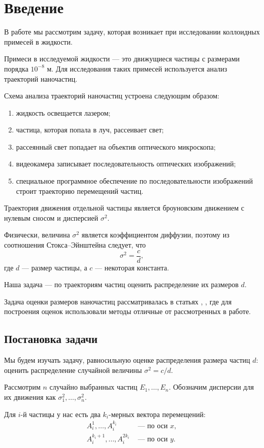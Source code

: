 \documentclass[../paper.tex]{subfiles}
\begin{document}
\section{Введение}
В работе мы рассмотрим задачу, которая возникает при исследовании коллоидных примесей в жидкости.

Примеси в исследуемой жидкости --- это движущиеся частицы с размерами порядка $10^{-8}$ м.
Для исследования таких примесей используется анализ траекторий наночастиц.

Схема анализа траекторий наночастиц устроена следующим образом:
\begin{enumerate}
	\item жидкость освещается лазером;
	\item частица, которая попала в луч, рассеивает свет;
	\item рассеянный свет попадает на объектив оптического микроскопа;
	\item видеокамера записывает последовательность оптических изображений;
	\item специальное программное обеспечение по последовательности изображений строит траекторию перемещений частиц.
\end{enumerate}

Траектория движения отдельной частицы является броуновским движением с нулевым сносом и дисперсией $\sigma^2$.

Физически, величина $\sigma^2$ является коэффициентом диффузии, поэтому из соотношения Стокса--Эйнштейна следует, что
\[
	\sigma^2 = \frac{c}{d}
,\] где $d$ --- размер частицы, а $c$ --- некоторая константа.

Наша задача ---  по траекториям частиц оценить распределение их размеров $d$.

Задача оценки размеров наночастиц рассматривалась 
в статьях \cite{Wagner2014}, \cite{Matsuura2018},
где для построения оценок использовали методы отличные от рассмотренных в работе.
\subsection{Постановка задачи}
Мы будем изучать задачу, равносильную оценке распределения размера частиц $d$: оценить распределение случайной величины $\sigma^2 = c/d$.

Рассмотрим $n$ случайно выбранных частиц $E_1, \dots, E_n$. 
Обозначим дисперсии для их движения как $\sigma_1^2, \dots, \sigma_n^2$. 

Для $i$-й частицы у нас есть два $k_i$-мерных вектора перемещений: 
\begin{align*}
	A_i^1, \dots, A_i^{k_i} &\text{ --- по оси } x, \\
	A_i^{k_i+1}, \dots, A_i^{2k_i} &\text{ --- по оси } y
.\end{align*}
\end{document}
